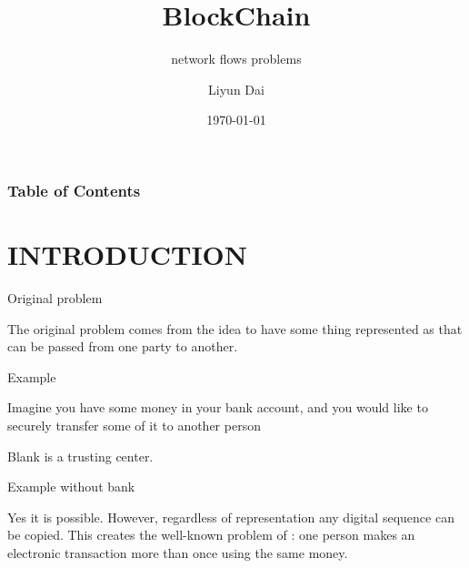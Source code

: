 \documentclass[serif]{beamer}
\title{BlockChain}
\subtitle{network flows problems}
\author{ Liyun Dai}
\institute{RISE, Southwest University, Chongqing, China}
\date{\today}
\begin{document}
\maketitle
\begin{frame}
  \frametitle{Table of Contents}
  \tableofcontents[currentsection]
\end{frame}

\section{INTRODUCTION}

\begin{frame}{Original problem}
	\begin{problem}
		The original problem comes from the idea to have some
		thing represented as {\color{red}{digital entity}} that can be passed {\color{red}{securely}}
		from one party to another.
	\end{problem}
\end{frame}

\begin{frame}{Example}
	\begin{example}
		Imagine you have some money in
		your bank account, and you would like to securely transfer
		some of it to another person
	\end{example}
	
	{\Huge Blank is a trusting center.}
\end{frame}

\begin{frame}{Example 	without bank }

	\begin{problem}
		Yes it is possible. However, regardless of representation any digital sequence can be copied.
		This creates the well-known problem of {\color{red}{“double-spending”}}:
		one person makes an electronic transaction more than once
		using the same money.
	\end{problem}
\end{frame}
\end{document}
